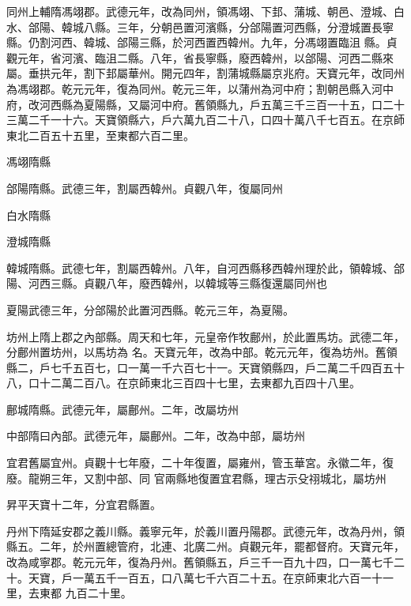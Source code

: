 \begin{pinyinscope}
 同州上輔隋馮翊郡。武德元年，改為同州，領馮翊、下邽、蒲城、朝邑、澄城、白水、郃陽、韓城八縣。三年，分朝邑置河濱縣，分郃陽置河西縣，分澄城置長寧縣。仍割河西、韓城、郃陽三縣，於河西置西韓州。九年，分馮翊置臨沮
 縣。貞觀元年，省河濱、臨沮二縣。八年，省長寧縣，廢西韓州，以郃陽、河西二縣來屬。垂拱元年，割下邽屬華州。開元四年，割蒲城縣屬京兆府。天寶元年，改同州為馮翊郡。乾元元年，復為同州。乾元三年，以蒲州為河中府；割朝邑縣入河中府，改河西縣為夏陽縣，又屬河中府。舊領縣九，戶五萬三千三百一十五，口二十三萬二千一十六。天寶領縣六，戶六萬九百二十八，口四十萬八千七百五。在京師東北二百五十五里，至東都六百二里。



 馮翊隋縣



 郃陽隋縣。武德三年，割屬西韓州。貞觀八年，復屬同州



 白水隋縣



 澄城隋縣



 韓城隋縣。武德七年，割屬西韓州。八年，自河西縣移西韓州理於此，領韓城、郃陽、河西三縣。貞觀八年，廢西韓州，以韓城等三縣復還屬同州也



 夏陽武德三年，分郃陽於此置河西縣。乾元三年，為夏陽。



 坊州上隋上郡之內部縣。周天和七年，元皇帝作牧鄜州，於此置馬坊。武德二年，分鄜州置坊州，以馬坊為
 名。天寶元年，改為中部。乾元元年，復為坊州。舊領縣二，戶七千五百七，口一萬一千六百七十一。天寶領縣四，戶二萬二千四百五十八，口十二萬二百八。在京師東北三百四十七里，去東都九百四十八里。



 鄜城隋縣。武德元年，屬鄜州。二年，改屬坊州



 中部隋曰內部。武德元年，屬鄜州。二年，改為中部，屬坊州



 宜君舊屬宜州。貞觀十七年廢，二十年復置，屬雍州，管玉華宮。永徽二年，復廢。龍朔三年，又割中部、同
 官兩縣地復置宜君縣，理古示殳祤城北，屬坊州



 昇平天寶十二年，分宜君縣置。



 丹州下隋延安郡之義川縣。義寧元年，於義川置丹陽郡。武德元年，改為丹州，領縣五。二年，於州置總管府，北連、北廣二州。貞觀元年，罷都督府。天寶元年，改為咸寧郡。乾元元年，復為丹州。舊領縣五，戶三千一百九十四，口一萬七千二十。天寶，戶一萬五千一百五，口八萬七千六百二十五。在京師東北六百一十一里，去東都
 九百二十里。




\end{pinyinscope}
